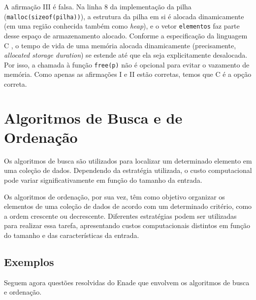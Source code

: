 \documentclass[12pt,a4paper]{article}
\begin{document}
A afirmação III é falsa. Na linha 8 da implementação da pilha (\texttt{malloc(sizeof(pilha))}),
a estrutura da pilha em si é alocada dinamicamente (em uma região conhecida também como \textit{heap}),
e o vetor \texttt{elementos} faz parte desse espaço de armazenamento alocado.
Conforme a especificação da linguagem C \parencite[seç.~7.24.3]{c2y},
o tempo de vida de uma memória alocada dinamicamente (precisamente, \textit{allocated storage duration})
se estende até que ela seja explicitamente desalocada.
Por isso, a chamada à função \texttt{free(p)} não é opcional para evitar o vazamento de memória.
Como apenas as afirmações I e II estão corretas, temos que C é a opção correta.

\section{Algoritmos de Busca e de Ordenação}
Os algoritmos de busca são utilizados para localizar um determinado elemento em uma coleção de dados.
Dependendo da estratégia utilizada, o custo computacional pode variar significativamente em função do tamanho da entrada.

Os algoritmos de ordenação, por sua vez, têm como objetivo organizar os elementos de uma coleção de dados de acordo com um determinado critério,
como a ordem crescente ou decrescente.
Diferentes estratégias podem ser utilizadas para realizar essa tarefa,
apresentando custos computacionais distintos em função do tamanho e das características da entrada.

\subsection{Exemplos}
Seguem agora questões resolvidas do Enade que envolvem os algoritmos de busca e ordenação.
\end{document}
